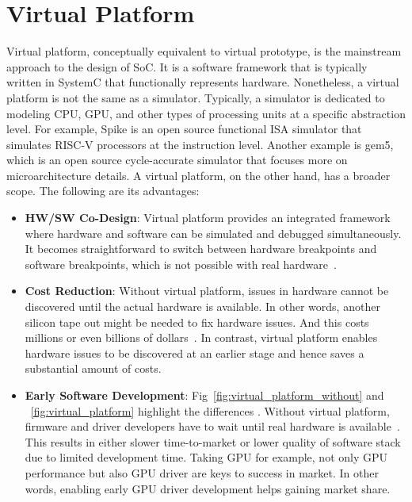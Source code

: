 
\section{Virtual Platform}

Virtual platform, conceptually equivalent to virtual prototype, is the mainstream approach to the design of \ac{SoC}. It is a software framework that is typically written in SystemC that functionally represents hardware. Nonetheless, a virtual platform is not the same as a simulator. Typically, a simulator is dedicated to modeling CPU, GPU, and other types of processing units at a specific abstraction level. For example, Spike is an open source functional ISA simulator that simulates RISC-V processors at the instruction level. Another example is gem5, which is an open source cycle-accurate simulator that focuses more on microarchitecture details.
A virtual platform, on the other hand, has a broader scope. The following are its advantages:
\begin{itemize}
    \item \textbf{HW/SW Co-Design}: Virtual platform provides an integrated framework where hardware and software can be simulated and debugged simultaneously. It becomes straightforward to switch between hardware breakpoints and software breakpoints, which is not possible with real hardware~\cite{hw_sw_codesign}.
    \item \textbf{Cost Reduction}: Without virtual platform, issues in hardware cannot be discovered until the actual hardware is available. In other words, another silicon tape out might be needed to fix hardware issues. And this costs millions or even billions of dollars~\cite{virtual_platform}. In contrast, virtual platform enables hardware issues to be discovered at an earlier stage and hence saves a substantial amount of costs. 
    \item \textbf{Early Software Development}: Fig~\ref{fig:virtual_platform_without} and ~\ref{fig:virtual_platform} highlight the differences . Without virtual platform, firmware and driver developers have to wait until real hardware is available~\cite{early_sw_development}. This results in either slower time-to-market or lower quality of software stack due to limited development time. Taking GPU for example, not only GPU performance but also GPU driver are keys to success in market. In other words, enabling early GPU driver development helps gaining market share.  
\end{itemize}

